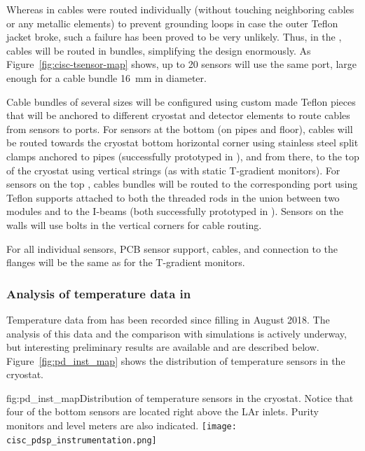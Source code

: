 Whereas in  cables were routed individually (without touching neighboring cables or any metallic elements) to prevent grounding loops in case the outer Teflon jacket broke, such a failure has been proved to be very unlikely. Thus, in the , cables will be routed in bundles, simplifying the design enormously. As Figure~\ref{fig:cisc-tsensor-map} shows, up to 20 sensors will use the same  port, large enough for a cable bundle \SI{16}{mm} in diameter.

Cable bundles of several sizes will be configured using custom made Teflon 
pieces %
that will be anchored to different cryostat and detector elements to route cables from sensors to  ports. For sensors at the bottom (on pipes and floor), cables will be routed towards the cryostat bottom horizontal corner using stainless steel split clamps anchored to pipes (successfully prototyped in ), and from there, to the top of the cryostat using vertical strings (as with static T-gradient monitors). For sensors on the top , cables bundles will be routed to the corresponding  port using Teflon supports attached to both the \frfour threaded rods in the union between two  modules and to the  I-beams (both successfully prototyped in ). Sensors on the walls will use bolts in the vertical corners for cable routing. 

For all individual sensors, PCB sensor support, cables, and connection to the flanges will be the same as for the T-gradient monitors. 
  

\subsubsection{Analysis of temperature data in }
\label{sec:fdgen-slow-cryo-temp-ana}

Temperature data from  has been recorded since  filling %
in August 2018. The analysis of this data and the comparison with  simulations is actively underway, but interesting preliminary results are available and are described below. Figure~\ref{fig:pd_inst_map} shows the distribution of temperature sensors in the  cryostat.  

\begin{dunefigure}{fig:pd_inst_map}{Distribution of temperature sensors in the  cryostat. Notice that four of the bottom sensors are located right above the LAr inlets. Purity monitors and level meters are also indicated. }
  \texttt{[image: cisc\_pdsp\_instrumentation.png]}%
\end{dunefigure}


